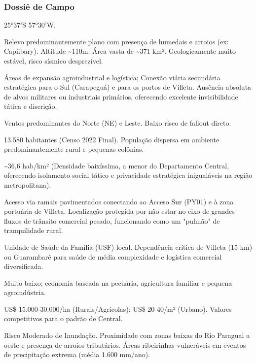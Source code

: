 \subsubsection{Dossiê de Campo}
\begin{description}[style=nextline,leftmargin=0.5cm,font=\bfseries]
\item[Coordenadas]  25°37'S 57°30'W.
\item[Topografia]  Relevo predominantemente plano com presença de humedais e arroios (ex: Capiibary). Altitude \textasciitilde 110m. Área vasta de \textasciitilde 371 km². Geologicamente muito estável, risco sísmico desprezível.
\item[Alvos Estratégicos]  Áreas de expansão agroindustrial e logística; Conexão viária secundária estratégica para o Sul (Carapeguá) e para os portos de Villeta. Ausência absoluta de alvos militares ou industriais primários, oferecendo excelente invisibilidade tática e discrição.
\item[Fallout]  Ventos predominantes do Norte (NE) e Leste. Baixo risco de fallout direto.
\item[População]  13.580 habitantes (Censo 2022 Final). População dispersa em ambiente predominantemente rural e pequenas colônias.
\item[Densidade]  \textasciitilde 36,6 hab/\allowbreak km² (Densidade baixíssima, a menor do Departamento Central, oferecendo isolamento social tático e privacidade estratégica inigualáveis na região metropolitana).
\item[Vias de Acesso]  Acesso via ramais pavimentados conectando ao Acceso Sur (PY01) e à zona portuária de Villeta. Localização protegida por não estar no eixo de grandes fluxos de trânsito comercial pesado, funcionando como um "pulmão" de tranquilidade rural.
\item[Serviços]  Unidade de Saúde da Família (USF) local. Dependência crítica de Villeta (15 km) ou Guarambaré para saúde de média complexidade e logística comercial diversificada.
\item[Custo de Vida]  Muito baixo; economia baseada na pecuária, agricultura familiar e pequena agroindústria.
\item[Preço da Terra]  US\$ 15.000-30.000/\allowbreak ha (Rurais/\allowbreak Agrícolas); US\$ 20-40/\allowbreak m² (Urbano). Valores competitivos para o padrão de Central.
\item[Hidrologia]  Risco Moderado de Inundação. Proximidade com zonas baixas do Rio Paraguai a oeste e presença de arroios tributários. Áreas ribeirinhas vulneráveis em eventos de precipitação extrema (média 1.600 mm/\allowbreak ano).

\end{description}
